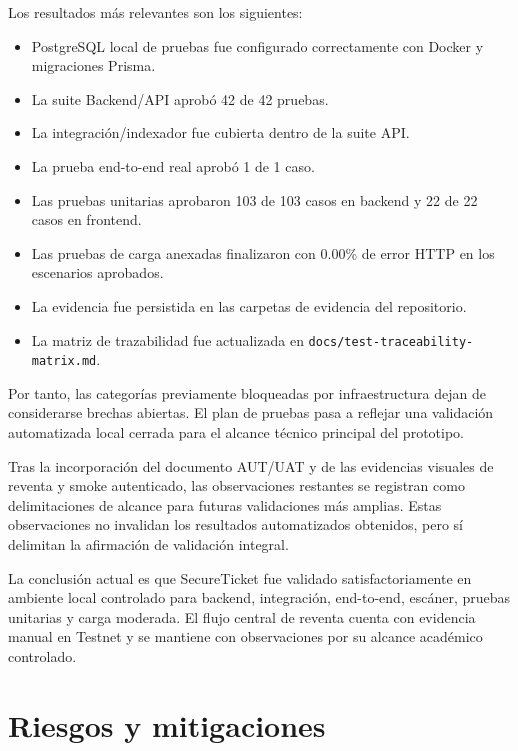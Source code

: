 \documentclass[12pt,letterpaper]{article}
\newcommand{\NombreProyecto}{SecureTicket}
\begin{document}
Los resultados más relevantes son los siguientes:

\begin{itemize}
    \item PostgreSQL local de pruebas fue configurado correctamente con Docker y migraciones Prisma.
    \item La suite Backend/API aprobó 42 de 42 pruebas.
    \item La integración/indexador fue cubierta dentro de la suite API.
    \item La prueba end-to-end real aprobó 1 de 1 caso.
    \item Las pruebas unitarias aprobaron 103 de 103 casos en backend y 22 de 22 casos en frontend.
    \item Las pruebas de carga anexadas finalizaron con 0.00\% de error HTTP en los escenarios aprobados.
    \item La evidencia fue persistida en las carpetas de evidencia del repositorio.
    \item La matriz de trazabilidad fue actualizada en \texttt{docs/test-traceability-matrix.md}.
\end{itemize}

Por tanto, las categorías previamente bloqueadas por infraestructura dejan de considerarse brechas abiertas. El plan de pruebas pasa a reflejar una validación automatizada local cerrada para el alcance técnico principal del prototipo.

Tras la incorporación del documento AUT/UAT y de las evidencias visuales de reventa y smoke autenticado, las observaciones restantes se registran como delimitaciones de alcance para futuras validaciones más amplias. Estas observaciones no invalidan los resultados automatizados obtenidos, pero sí delimitan la afirmación de validación integral.

La conclusión actual es que \NombreProyecto{} fue validado satisfactoriamente en ambiente local controlado para backend, integración, end-to-end, escáner, pruebas unitarias y carga moderada. El flujo central de reventa cuenta con evidencia manual en Testnet y se mantiene con observaciones por su alcance académico controlado.


\section{Riesgos y mitigaciones}
\end{document}
